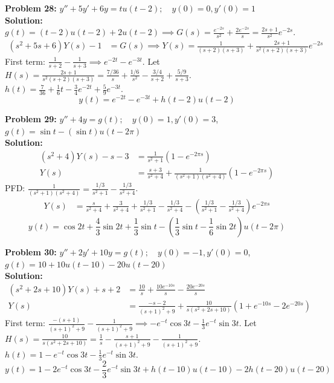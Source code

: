 \documentclass[11pt, letterpaper]{article}
\theoremstyle{definition}
\theoremstyle{remark}
\begin{document}
\textbf{Problem 28:} $y''+5y'+6y = tu(t-2); \quad y(0)=0, y'(0)=1$
\\[4pt]
\textbf{Solution:}
$g(t) = (t-2)u(t-2) + 2u(t-2) \implies G(s) = \frac{e^{-2s}}{s^2} + \frac{2e^{-2s}}{s} = \frac{2s+1}{s^2}e^{-2s}$.
\begin{align*}
(s^2+5s+6)Y(s) - 1 &= G(s) \implies Y(s) = \frac{1}{(s+2)(s+3)} + \frac{2s+1}{s^2(s+2)(s+3)}e^{-2s}
\end{align*}
First term: $\frac{1}{s+2} - \frac{1}{s+3} \implies e^{-2t} - e^{-3t}$.
Let $H(s) = \frac{2s+1}{s^2(s+2)(s+3)} = \frac{7/36}{s} + \frac{1/6}{s^2} - \frac{3/4}{s+2} + \frac{5/9}{s+3}$.
$h(t) = \frac{7}{36} + \frac{1}{6}t - \frac{3}{4}e^{-2t} + \frac{5}{9}e^{-3t}$.
\[
y(t) = e^{-2t} - e^{-3t} + h(t-2)u(t-2)
\]

\textbf{Problem 29:} $y''+4y = g(t); \quad y(0)=1, y'(0)=3$, $g(t) = \sin t - (\sin t)u(t-2\pi)$
\\[4pt]
\textbf{Solution:}
\begin{align*}
(s^2+4)Y(s) - s - 3 &= \frac{1}{s^2+1}(1 - e^{-2\pi s}) \\
Y(s) &= \frac{s+3}{s^2+4} + \frac{1}{(s^2+1)(s^2+4)}(1 - e^{-2\pi s})
\end{align*}
PFD: $\frac{1}{(s^2+1)(s^2+4)} = \frac{1/3}{s^2+1} - \frac{1/3}{s^2+4}$.
\begin{align*}
Y(s) &= \frac{s}{s^2+4} + \frac{3}{s^2+4} + \frac{1/3}{s^2+1} - \frac{1/3}{s^2+4} - \left(\frac{1/3}{s^2+1} - \frac{1/3}{s^2+4}\right)e^{-2\pi s}
\end{align*}
\[
y(t) = \cos 2t + \frac{4}{3}\sin 2t + \frac{1}{3}\sin t - \left(\frac{1}{3}\sin t - \frac{1}{6}\sin 2t\right)u(t-2\pi)
\]

\textbf{Problem 30:} $y''+2y'+10y = g(t); \quad y(0)=-1, y'(0)=0$, $g(t) = 10 + 10u(t-10) - 20u(t-20)$
\\[4pt]
\textbf{Solution:}
\begin{align*}
(s^2+2s+10)Y(s) + s + 2 &= \frac{10}{s} + \frac{10e^{-10s}}{s} - \frac{20e^{-20s}}{s} \\
Y(s) &= \frac{-s-2}{(s+1)^2+9} + \frac{10}{s(s^2+2s+10)}(1 + e^{-10s} - 2e^{-20s})
\end{align*}
First term: $\frac{-(s+1)}{(s+1)^2+9} - \frac{1}{(s+1)^2+9} \implies -e^{-t}\cos 3t - \frac{1}{3}e^{-t}\sin 3t$.
Let $H(s) = \frac{10}{s(s^2+2s+10)} = \frac{1}{s} - \frac{s+1}{(s+1)^2+9} - \frac{1}{(s+1)^2+9}$.
$h(t) = 1 - e^{-t}\cos 3t - \frac{1}{3}e^{-t}\sin 3t$.
\[
y(t) = 1 - 2e^{-t}\cos 3t - \frac{2}{3}e^{-t}\sin 3t + h(t-10)u(t-10) - 2h(t-20)u(t-20)
\]
\end{document}

